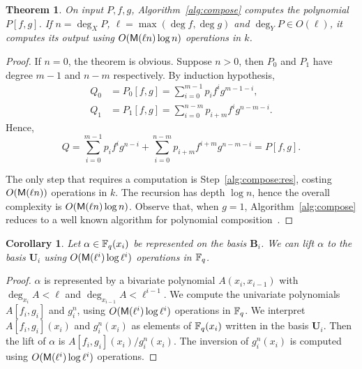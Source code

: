 \documentclass{sig-alternate}
\newtheorem{theorem}[definition]{Theorem}
\newtheorem{corollary}[definition]{Corollary}
\newcommand{\bb}{\mathbf{B}}
\newcommand{\uu}{\mathbf{U}}  %
\begin{document}
\begin{theorem}
  \label{th:compose}
  On input $P,f,g$, Algorithm~\ref{alg:compose} computes the
  polynomial $P[f,g]$. If $n=\deg_XP$, $\ell=\max(\deg f, \deg g)$ and
  $\deg_YP\in O(\ell)$, it computes its output using $O(\mathsf{M}(\ell
  n)\log n)$ operations in $k$.
\end{theorem}
\begin{proof}
  If $n=0$, the theorem is obvious. Suppose $n>0$, then $P_0$ and
  $P_1$ have degree $m-1$ and $n-m$ respectively. By induction
  hypothesis,
  \begin{equation}
    \begin{aligned}
      Q_0 &= P_0[f,g] = \sum_{i=0}^{m-1}p_if^ig^{m-1-i},\\
      Q_1 &= P_1[f,g] = \sum_{i=0}^{n-m}p_{i+m}f^ig^{n-m-i}.   
    \end{aligned}
  \end{equation}
  Hence,
  \begin{equation}
    Q = \sum_{i=0}^{m-1}p_if^ig^{n-i} +
    \sum_{i=0}^{n-m}p_{i+m}f^{i+m}g^{n-m-i} =
    P[f,g].
  \end{equation}

  The only step that requires a computation is
  Step~\ref{alg:compose:res}, costing $O(\mathsf{M}(\ell n))$ operations in
  $k$. The recursion has depth $\log n$, hence the overall complexity
  is $O(\mathsf{M}(\ell n)\log n)$.  Observe that, when $g=1$,
  Algorithm~\ref{alg:compose} reduces to a well known algorithm for
  polynomial composition~\cite[Ex.~9.20]{vzGG}.
\end{proof}

\begin{corollary}
  Let $\alpha\in\mathbb{F}_q(x_i)$ be represented on the basis $\bb_i$.
  We can \emph{lift} $\alpha$ to the basis $\uu_i$ using
  $O(\mathsf{M}(\ell^i)\log\ell^i)$ operations in $\mathbb{F}_q$.
\end{corollary}
\begin{proof}
  $\alpha$ is represented by a bivariate polynomial $A(x_i,x_{i-1})$ with
  $\deg_{x_i}A<\ell$ and $\deg_{x_{i-1}}A<\ell^{i-1}$.  We compute the univariate
  polynomials $A[f_i,g_i]$ and $g_i^n$, using $O(\mathsf{M}(\ell^i)\log\ell^i)$
  operations in $\mathbb{F}_q$. We interpret $A[f_i,g_i](x_i)$ and $g_i^n(x_i)$ as
  elements of $\mathbb{F}_q(x_i)$ written in the basis $\uu_i$. Then the
  lift of $\alpha$ is $A[f_i,g_i](x_i)/g_i^n(x_i)$. The inversion of $g_i^n(x_i)$
  is computed using $O(\mathsf{M}(\ell^i)\log\ell^i)$ operations.
\end{proof}
\end{document}
